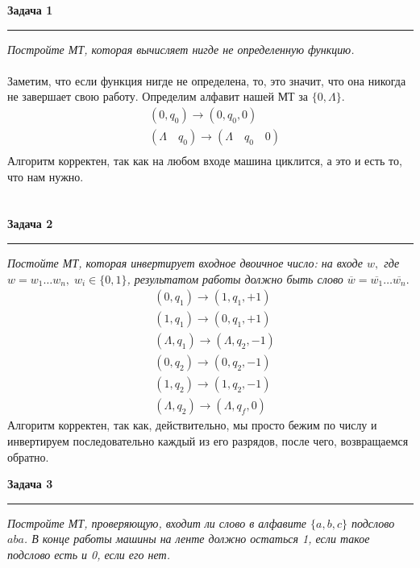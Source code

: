 \documentclass[a4paper,11pt]{article}
\begin{document}
\textbf{\large Задача 1}
\medskip\hrule\medskip
\textit{Постройте МТ, которая вычисляет нигде не определенную функцию.} \\ \\

Заметим, что если функция нигде не определена, то, это значит,  что она никогда не завершает свою работу.  Определим алфавит нашей МТ за $ \{0, \Lambda \} $.
\begin{align*}
	&(0, q_0) \rightarrow (0, q_0, 0) \\
	&(\Lambda \quad q_0) \rightarrow (\Lambda \quad q_0 \quad 0) \\
\end{align*}
Алгоритм корректен, так как на любом входе машина циклится, а это и есть то, что нам нужно.
\\ \\ \\







\textbf{\large Задача 2}
\medskip\hrule\medskip
\textit{Постойте МТ, которая инвертирует входное двоичное число:  на входе $ w, $ где $ w = w_1 \dots w_n, \; w_i \in \{0, 1\}  $, результатом работы должно быть слово $ \overline{w} = \overline{w_1} \dots \overline{w_n}. $} \\

\begin{align*}
	&(0, q_1) \rightarrow (1, q_1, +1) \\
	&(1, q_1) \rightarrow (0, q_1, +1) \\
	&(\Lambda, q_1) \rightarrow (\Lambda, q_2, -1) \\[10pt]
	&(0, q_2) \rightarrow (0, q_2, -1) \\
	&(1, q_2) \rightarrow (1, q_2, -1) \\
	&(\Lambda, q_2) \rightarrow (\Lambda, q_f, 0 ) 
\end{align*}
Алгоритм корректен, так как, действительно, мы просто бежим по числу и инвертируем последовательно каждый из его разрядов, после чего, возвращаемся обратно.
\newpage









\textbf{\large Задача 3}
\medskip\hrule\medskip
\textit{Постройте МТ, проверяющую, входит ли слово в алфавите $ \{a, b, c\} $ подслово $ aba $. В конце работы машины на ленте должно остаться 1, если такое подслово есть и 0, если его нет.} \\
\end{document}
